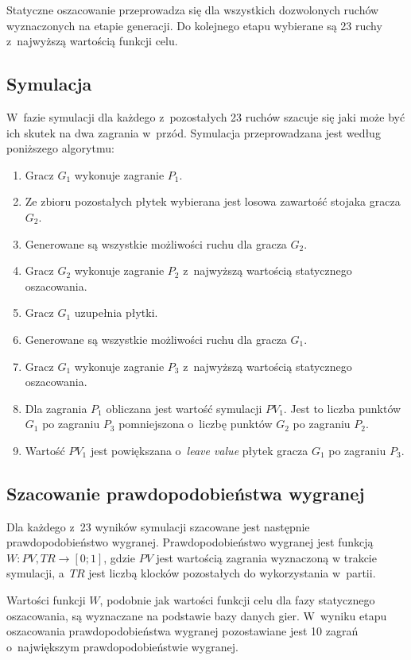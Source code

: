 \documentclass[a4paper,twocolumn,12pt]{article}
\theoremstyle{definition}
\begin{document}
Statyczne oszacowanie przeprowadza się dla wszystkich dozwolonych ruchów wyznaczonych na etapie generacji. Do kolejnego etapu wybierane są 23 ruchy z~najwyższą wartością funkcji celu.

\subsection*{Symulacja}

W~fazie symulacji dla każdego z~pozostałych 23 ruchów szacuje się jaki może być ich skutek na dwa zagrania w~przód. Symulacja przeprowadzana jest według poniższego algorytmu:

\begin{enumerate}
	\item Gracz $G_{1}$ wykonuje zagranie $P_{1}$.
	\item Ze zbioru pozostałych płytek wybierana jest losowa zawartość stojaka gracza $G_{2}$.
	\item Generowane są wszystkie możliwości ruchu dla gracza $G_{2}$.
	\item Gracz $G_{2}$ wykonuje zagranie $P_{2}$ z~najwyższą wartością statycznego oszacowania.
	\item Gracz $G_{1}$ uzupełnia płytki. 
	\item Generowane są wszystkie możliwości ruchu dla gracza $G_{1}$.
	\item Gracz $G_{1}$ wykonuje zagranie $P_{3}$ z~najwyższą wartością statycznego oszacowania.
	\item Dla zagrania $P_{1}$ obliczana jest wartość symulacji $PV_{1}$. Jest to liczba punktów $G_{1}$ po zagraniu $P_{3}$ pomniejszona o~liczbę punktów $G_{2}$ po zagraniu $P_{2}$.
	\item Wartość $PV_{1}$ jest powiększana o~\emph{leave value} płytek gracza $G_{1}$ po zagraniu $P_{3}$.
\end{enumerate}

\subsection*{Szacowanie prawdopodobieństwa wygranej}

Dla każdego z~23 wyników symulacji szacowane jest następnie prawdopodobieństwo wygranej. Prawdopodobieństwo wygranej jest funkcją $W: PV, TR \rightarrow [0;1]$, gdzie $PV$ jest wartością zagrania wyznaczoną w trakcie symulacji, a~$TR$ jest liczbą klocków pozostałych do wykorzystania w~partii. 

Wartości funkcji $W$, podobnie jak wartości funkcji celu dla fazy statycznego oszacowania, są wyznaczane na podstawie bazy danych gier. W~wyniku etapu oszacowania prawdopodobieństwa wygranej pozostawiane jest 10 zagrań o~największym prawdopodobieństwie wygranej.
\end{document}
